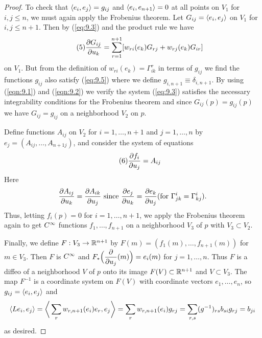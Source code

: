 \documentclass[../main]{subfiles}
\begin{document}
\begin{proof}
To check that $\left\langle e_i,e_j\right\rangle = g_{ij} $ and $\left\langle e_i,e_{n+1}\right\rangle=0$ at all points on $V_{1}$ for $i, j \leq n$, we must again apply the Frobenius theorem. Let $G_{i j}=\left\langle e_i,e_j\right\rangle$ on $V_{1}$ for $i, j \leq n+1$. Then by (\ref{eq:9.3}) and the product rule we have
\[\tag{5}\label{eq:9.5} \dfrac{\partial G_{ij}}{\partial u_k} = \sum_{r=1}^{n+1}[w_{ri}(e_k)G_{rj} + w_{rj}(e_k)G_{ir}]\]
on $V_{1}$. But from the definition of $w_{r i}(e_{k})=\Gamma_{i k}^{r}$ in terms of $g_{i j}$ we find the functions $g_{i j}$ also satisfy (\ref{eq:9.5}) where we define $g_{i,n+1} \equiv \delta_{i, n+1}$. By using (\ref{eqn:9.1}) and (\ref{eqn:9.2}) we verify the system (\ref{eq:9.3}) satisfies the necessary integrability conditions for the Frobenius theorem and since $ G_{i j}(p)=g_{i j}(p)$ we have $G_{i j}=g_{i j}$ on a neighborhood $V_{2}$ on $p .$

Define functions $A_{i j}$ on $V_{2}$ for $i=1, \ldots, n+1$ and $j=1, \ldots, n$ by \newline $e_{j}=(A_{i j}, \ldots, A_{n+1 j})$, and consider the system of equations
\[\tag{6}\label{eq:9.6} \dfrac{\partial f_i}{\partial u_j} = A_{ij} \]
Here \[\dfrac{\partial A_{ij}}{\partial u_k} = \dfrac{\partial A_{ik}}{\partial u_j}\text{ since } \dfrac{\partial e_j}{\partial u_k}=\dfrac{\partial e_k}{\partial u_j}(\text{for  }\Gamma^i_{jk}=\Gamma^i_{kj}).\] Thus, letting $f_{i}(p)=0$ for $i=1, \ldots, n+1$, we apply the Frobenius theorem again to get $C^\infty$ functions $f_{1}, \ldots, f_{n+1}$ on a neighborhood $V_{3}$ of $p$ with $V_{3} \subset V_{2}$.

Finally, we define $F: V_{3} \to \mathbb{R}^{n+1}$ by $F(m)=(f_{1}(m), \ldots, f_{n+1}(m))$ for $m\in V_{3}$. Then $F$ is $C^\infty$ and $F_\ast\Big(\dfrac{\partial }{\partial u_j}(m)\Big) = e_i(m)$ for $j=1, \ldots, n$. Thus $F$ is a diffeo of a neighborhood $V$ of $p$ onto its image $F(V)\subset \mathbb{R}^{n+1}$ and $V \subset V_{3}$. The map $F^{-1}$ is a coordinate system on $F(V)$ with coordinate vectors $e_{1}, \ldots, e_{n}$, so $g_{i j}=\left\langle e_i,e_j\right\rangle$ and 
\[\left\langle Le_i,e_j\right\rangle = \bigg\langle\sum_rw_{r,n+1}(e_i)e_r,e_j\bigg\rangle = \sum_r w_{r,n+1}(e_i)g_{rj} = \sum_{r,s} (g^{-1})_{rs}b_{si}g_{rj} = b_{ji}\]
as desired.

\end{proof}
\end{document}
